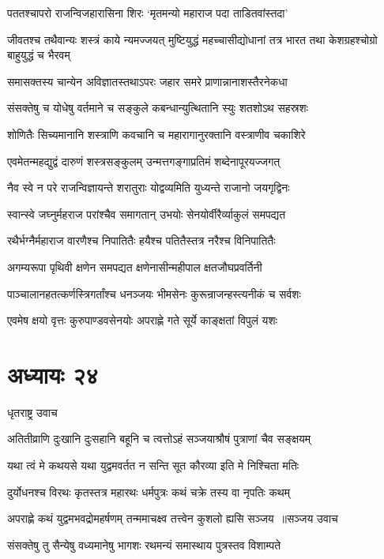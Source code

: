 \twolineshloka
{पततश्चापरो राजन्विजहारासिना शिरः}
{`मृतमन्यो महाराज पदा ताडितवांस्तदा'}


\threelineshloka
{जीवतश्च तथैवान्यः शस्त्रं काये न्यमज्जयत्}
{मुष्टियुद्धं महच्चासीद्योधानां तत्र भारत}
{तथा केशग्रहश्चोग्रो बाहुयुद्धं च भैरवम्}


\twolineshloka
{समासक्तस्य चान्येन अविज्ञातस्तथाऽपरः}
{जहार समरे प्राणान्नानाशस्तैरनेकधा}


\twolineshloka
{संसक्तेषु च योधेषु वर्तमाने च सङ्कुले}
{कबन्धान्युत्थितानि स्युः शतशोऽथ सहस्रशः}


\twolineshloka
{शोणितैः सिच्यमानानि शस्त्राणि कवचानि च}
{महारागानुरक्तानि वस्त्राणीव चकाशिरे}


\twolineshloka
{एवमेतन्महद्युद्वं दारुणं शस्त्रसङ्कुलम्}
{उन्मत्तगङ्गाप्रतिमं शब्देनापूरयज्जगत्}


\twolineshloka
{नैव स्वे न परे राजन्विज्ञायन्ते शरातुराः}
{योद्वव्यमिति युध्यन्ते राजानो जयगृद्विनः}


\twolineshloka
{स्वान्स्वे जघ्नुर्महराज परांश्चैव समागतान्}
{उभयोः सेनयोर्वीरैर्व्याकुलं समपद्यत}


\twolineshloka
{रथैर्भग्नैर्महाराज वारणैश्च निपातितैः}
{हयैश्च पतितैस्तत्र नरैश्च विनिपातितैः}


\twolineshloka
{अगम्यरूपा पृथिवी क्षणेन समपद्यत}
{क्षणेनासीन्महीपाल क्षतजौघप्रवर्तिनी}


\twolineshloka
{पाञ्चालानहतत्कर्णस्त्रिगर्तांश्च धनञ्जयः}
{भीमसेनः कुरून्राजन्हस्त्यनीकं च सर्वशः}


\twolineshloka
{एवमेष क्षयो वृत्तः कुरुपाण्डवसेनयोः}
{अपराह्णे गते सूर्ये काङ्क्षतां विपुलं यशः}


\chapter{अध्यायः २४}
\twolineshloka
{धृतराष्ट्र उवाच}
{}


\twolineshloka
{अतितीव्राणि दुःखानि दुःसहानि बहूनि च}
{त्वत्तोऽहं सञ्जयाश्रौषं पुत्राणां चैव सङ्क्षयम्}


\twolineshloka
{यथा त्वं मे कथयसे यथा युद्वमवर्तत}
{न सन्ति सूत कौरव्या इति मे निश्चिता मतिः}


\twolineshloka
{दुर्योधनश्च विरथः कृतस्तत्र महारथः}
{धर्मपुत्रः कथं चक्रे तस्य वा नृपतिः कथम्}


\threelineshloka
{अपराह्णे कथं युद्वमभवद्रोमहर्षणम्}
{तन्ममाचक्ष्व तत्त्वेन कुशलो ह्यसि सञ्जय ॥सञ्जय उवाच}
{}


\twolineshloka
{संसक्तेषु तु सैन्येषु वध्यमानेषु भागशः}
{रथमन्यं समास्थाय पुत्रस्तव विशाम्पते}


